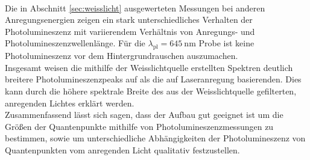 \\
Die in Abschnitt \ref{sec:weisslicht} ausgewerteten Messungen bei anderen Anregungsenergien zeigen ein stark unterschiedliches Verhalten der Photolumineszenz
mit variierendem Verhältnis von Anregungs- und Photolumineszenzwellenlänge. Für die $\lambda_{\text{pl}} = \SI{645}{\nano\meter}$ Probe ist keine Photolumineszenz vor dem Hintergrundrauschen auszumachen. \\
Insgesamt weisen die mithilfe der Weisslichtquelle erstellten Spektren deutlich breitere Photolumineszenzpeaks auf als die auf Laseranregung basierenden. Dies kann durch die höhere spektrale Breite des aus der Weisslichtquelle gefilterten, anregenden Lichtes erklärt werden.\\

Zusammenfassend lässt sich sagen, dass der Aufbau gut geeignet ist um die Größen der Quantenpunkte mithilfe von Photolumineszenzmessungen zu bestimmen, sowie um unterschiedliche Abhängigkeiten der Photolumineszenz von Quantenpunkten vom anregenden Licht qualitativ festzustellen.\\
%
%
